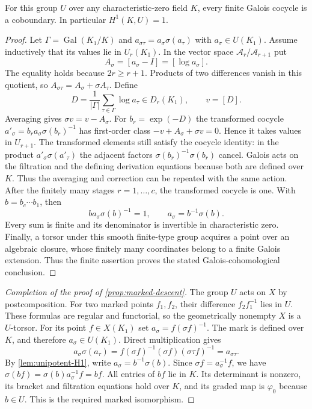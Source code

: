 \begin{lemma}\label{lem:unipotent-H1}
For this group $U$ over any characteristic-zero field $K$, every finite
Galois cocycle is a coboundary. In particular $H^1(K,U)=1$.
\end{lemma}

\begin{proof}
Let $\Gamma=\operatorname{Gal}(K_1/K)$ and
$a_{\sigma\tau}=a_\sigma\sigma(a_\tau)$ with $a_\sigma\in U(K_1)$.
Assume inductively that its values lie in $U_r(K_1)$. In the vector space
$\mathcal A_r/\mathcal A_{r+1}$ put
\[
 A_\sigma=[a_\sigma-I]=[\log a_\sigma].
\]
The equality holds because $2r\geq r+1$. Products of two differences
vanish in this quotient, so
$A_{\sigma\tau}=A_\sigma+\sigma A_\tau$. Define
\[
 D=\frac1{|\Gamma|}\sum_{\tau\in\Gamma}\log a_\tau
       \in D_r(K_1),\qquad v=[D].
\]
Averaging gives $\sigma v=v-A_\sigma$. For $b_r=\exp(-D)$ the transformed
cocycle $a'_\sigma=b_ra_\sigma\sigma(b_r)^{-1}$ has first-order class
$-v+A_\sigma+\sigma v=0$. Hence it takes values in $U_{r+1}$.
The transformed elements still satisfy the cocycle identity: in the
product $a'_\sigma\sigma(a'_\tau)$ the adjacent factors
$\sigma(b_r)^{-1}\sigma(b_r)$ cancel. Galois acts on the filtration
and the defining derivation equations because both are defined over $K$.
Thus the averaging and correction can be repeated with the same action.
After the finitely many stages $r=1,\ldots,c$, the transformed cocycle
is one. With $b=b_c\cdots b_1$,
then
\[
 ba_\sigma\sigma(b)^{-1}=1,\qquad a_\sigma=b^{-1}\sigma(b).
\]
Every sum is finite and its denominator is invertible in characteristic
zero. Finally, a torsor under this smooth finite-type group acquires a
point over an algebraic closure, whose finitely many coordinates belong
to a finite Galois extension. Thus the finite assertion proves the stated
Galois-cohomological conclusion.
\end{proof}

\begin{proof}[Completion of the proof of \cref{prop:marked-descent}]
The group $U$ acts on $X$ by postcomposition. For two marked points
$f_1,f_2$, their difference $f_2f_1^{-1}$ lies in $U$. These formulas
are regular and functorial, so the geometrically nonempty $X$ is a
$U$-torsor. For its point $f\in X(K_1)$ set
$a_\sigma=f(\sigma f)^{-1}$. The mark is defined over $K$, and therefore
$a_\sigma\in U(K_1)$. Direct multiplication gives
\[
 a_\sigma\sigma(a_\tau)
 =f(\sigma f)^{-1}(\sigma f)(\sigma\tau f)^{-1}
 =a_{\sigma\tau}.
\]
By \cref{lem:unipotent-H1}, write $a_\sigma=b^{-1}\sigma(b)$.
Since $\sigma f=a_\sigma^{-1}f$, we have
$\sigma(bf)=\sigma(b)a_\sigma^{-1}f=bf$.
All entries of $bf$ lie in $K$. Its determinant is nonzero, its bracket
and filtration equations hold over $K$, and its graded map is $\varphi_0$
because $b\in U$. This is the required marked isomorphism.
\end{proof}

